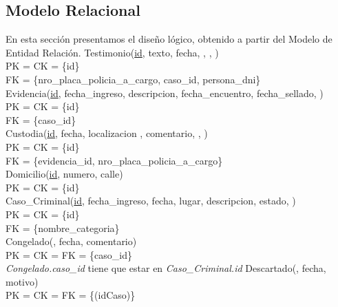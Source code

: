 \documentclass[10pt,a4paper]{article}
\begin{document}
\subsection{Modelo Relacional}
En esta sección presentamos el diseño lógico, obtenido a partir del Modelo de Entidad Relación. 
\newline
\newline
Testimonio(\underline{id}, texto, fecha, , , )\\
	PK = CK = \{id\}\\ 
	FK = \{nro\_placa\_policia\_a\_cargo, caso\_id, persona\_dni\}\\ 
\newline
Evidencia(\underline{id}, fecha\_ingreso, descripcion, fecha\_encuentro, fecha\_sellado, )\\ 
	PK = CK = \{id\} \\
	FK = \{caso\_id\}\\ 
\newline
Custodia(\underline{id}, fecha, localizacion ,  comentario, , )\\ 
	PK = CK = \{id\} \\
	FK = \{evidencia\_id, nro\_placa\_policia\_a\_cargo\}\\ 
\newline
Domicilio(\underline{id}, numero, calle)\\ 
	PK = CK = \{id\}\\ 
\newline
Caso\_Criminal(\underline{id}, fecha\_ingreso, fecha, lugar, descripcion, estado, )\\ 
	PK = CK = \{id\}\\ 
	FK = \{nombre\_categoria\}\\ 
\newline
Congelado(, fecha, comentario)\\ 
	PK = CK = FK = \{caso\_id\}\\ 
\newline
\textit{Congelado.caso\_id} tiene que estar en \textit{Caso\_Criminal.id}
\newline
\newline
Descartado(, fecha, motivo)\\ 
	PK = CK = FK = \{(idCaso)\}\\ 
\newline
\end{document}
